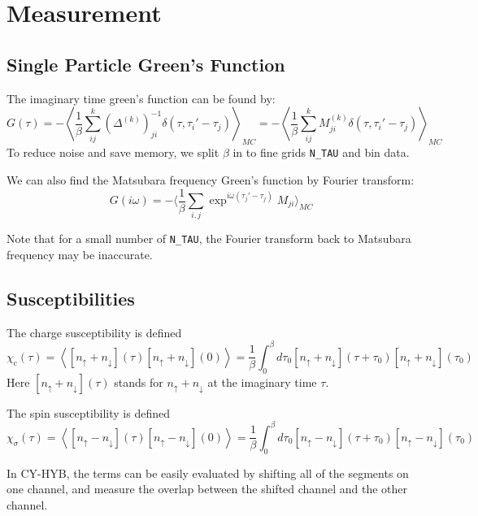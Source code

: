 \section{Measurement}
\label{sec:cthyb_measurement}
\subsection{Single Particle Green's Function}
The imaginary time green's function can be found by:
\[
G(\tau)=-\left\langle\frac{1}{\beta}\sum_{ij}^k
\left(\Delta^{(k)}\right)^{-1}_{ji}\delta(\tau,\tau_i'-\tau_j)\right\rangle_{MC}
=-\left\langle\frac{1}{\beta}\sum_{ij}^k
M^{(k)}_{ji}\delta(\tau,\tau_i'-\tau_j)\right\rangle_{MC}
\]
To reduce noise and save memory, we split $\beta$ in to fine grids \verb|N_TAU| 
and bin data. 

We can also find the Matsubara frequency Green's function by 
Fourier transform:
\[
G(i\omega)=-\langle\frac{1}{\beta}\sum_{i,j}\exp^{i\omega(\tau_j'-\tau_j)}M_{ji}\rangle_{MC}
\]

Note that for a small number of \verb|N_TAU|,
the Fourier transform back to Matsubara frequency may be inaccurate. 


\subsection{Susceptibilities}

The charge susceptibility is defined 
\begin{equation}
  \label{eq:chi-charge}
  \chi_\mathrm{c}(\tau)=\left\langle[n_\uparrow+n_\downarrow](\tau)  [n_\uparrow+n_\downarrow](0)\right\rangle=\frac{1}{\beta}\int_0^\beta d\tau_0[n_\uparrow+n_\downarrow](\tau+\tau_0)  [n_\uparrow+n_\downarrow](\tau_0)
\end{equation}
Here $[n_\uparrow+n_\downarrow](\tau)$ stands for $n_\uparrow+n_\downarrow$ 
at the imaginary time $\tau$.

The spin susceptibility is defined 
\begin{equation}
  \label{eq:chi-spin}
  \chi_\sigma(\tau)=\left\langle[n_\uparrow-n_\downarrow](\tau)  [n_\uparrow-n_\downarrow](0)\right\rangle=\frac{1}{\beta}\int_0^\beta d\tau_0[n_\uparrow-n_\downarrow](\tau+\tau_0)  [n_\uparrow-n_\downarrow](\tau_0)
\end{equation}

In CY-HYB, the terms can be easily evaluated by shifting all of the segments on one
channel, and measure the overlap between the shifted channel and the other channel.



